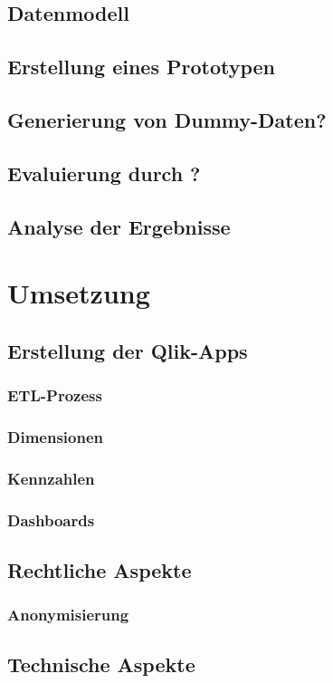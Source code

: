 \documentclass[11pt]{article}
\begin{document}
\subsection{Datenmodell}
\subsection{Erstellung eines Prototypen}
\subsection{Generierung von Dummy-Daten?}
\subsection{Evaluierung durch ?}
\subsection{Analyse der Ergebnisse}


\section{Umsetzung}
\lipsum[1-37]
\subsection{Erstellung der Qlik-Apps}
\subsubsection{ETL-Prozess}
\subsubsection{Dimensionen}
\subsubsection{Kennzahlen}
\subsubsection{Dashboards}
\subsection{Rechtliche Aspekte}
\subsubsection{Anonymisierung}
\subsection{Technische Aspekte}
\end{document}
